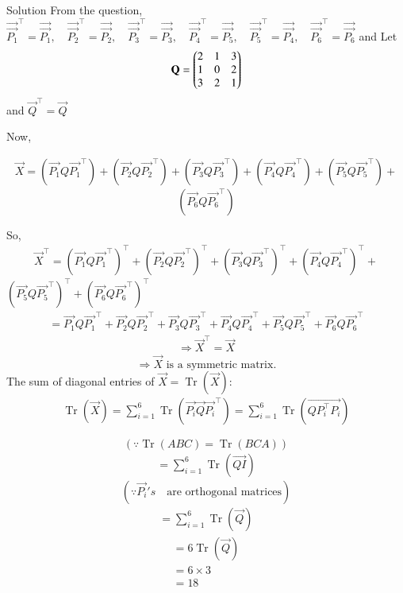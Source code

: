 \documentclass{beamer}
\begin{document}
\begin{frame}{Solution}
From the question,
$
\vec{\vec{P_1}}^\top = \vec{\vec{P_1}}, \quad \vec{\vec{P_2}}^\top = \vec{\vec{P_2}}, \quad \vec{\vec{P_3}}^\top = \vec{\vec{P_3}}, \quad \vec{\vec{P_4}}^\top = \vec{\vec{P_5}}, \quad \vec{\vec{P_5}}^\top = \vec{\vec{P_4}}, \quad \vec{\vec{P_6}}^\top = \vec{\vec{P_6}}$
and Let 
\begin{align}
\mathbf{Q} = \begin{pmatrix}
2 & 1 & 3 \\
1 & 0 & 2 \\
3 & 2 & 1 \end{pmatrix}
\end{align}
and $ \vec{Q}^\top = \vec{Q}$

Now,

\begin{align}
\vec{X} = (\vec{P_1} Q \vec{P_1}^\top) + (\vec{P_2} Q \vec{P_2}^\top) + (\vec{P_3} Q \vec{P_3}^\top) + (\vec{P_4} Q \vec{P_4}^\top) + (\vec{P_5} Q \vec{P_5}^\top) + 
\end{align}
$$
(\vec{P_6} Q \vec{P_6}^\top)
$$
\end{frame}
\begin{frame}
So,
\begin{align}
\vec{X}^\top = (\vec{P_1} Q \vec{P_1}^\top)^\top + (\vec{P_2} Q \vec{P_2}^\top)^\top + (\vec{P_3} Q \vec{P_3}^\top)^\top + (\vec{P_4} Q \vec{P_4}^\top)^\top + 
\end{align}
$(\vec{P_5} Q \vec{P_5}^\top)^\top + (\vec{P_6} Q \vec{P_6}^\top)^\top$
\begin{align}
= \vec{P_1} Q \vec{P_1}^\top + \vec{P_2} Q \vec{P_2}^\top + \vec{P_3} Q \vec{P_3}^\top + \vec{P_4} Q \vec{P_4}^\top + \vec{P_5} Q \vec{P_5}^\top + \vec{P_6} Q \vec{P_6}^\top
\end{align}
\begin{align}
\Rightarrow \vec{X}^\top = \vec{X}
\end{align}
$$
\Rightarrow \vec{X} \text{ is a symmetric matrix.}
$$
The sum of diagonal entries of $\vec{X} = \operatorname{Tr}(\vec{X})$:
\begin{align}
\operatorname{Tr}(\vec{X}) = \sum_{i=1}^6 \operatorname{Tr}(\vec{P_i} \vec{Q} \vec{P_i}^\top) = \sum_{i=1}^6 \operatorname{Tr}(\vec{QP_i^\top P_i})
\end{align}
\end{frame}
\begin{frame}
   $$
(\because \operatorname{Tr}(ABC) = \operatorname{Tr}(BCA))
$$
\begin{align}
= \sum_{i=1}^6 \operatorname{Tr}(\vec{Q I})
\end{align}
$$
(\because \vec{P_i}'s \quad  \text{are orthogonal matrices})
$$
\begin{align}
= \sum_{i=1}^6 \operatorname{Tr}(\vec{Q})
\end{align}
\begin{align}
= 6\operatorname{Tr}(\vec{Q})\\
= 6\times 3 \\
=18 \quad \
\end{align}
\end{frame}
\end{document}
